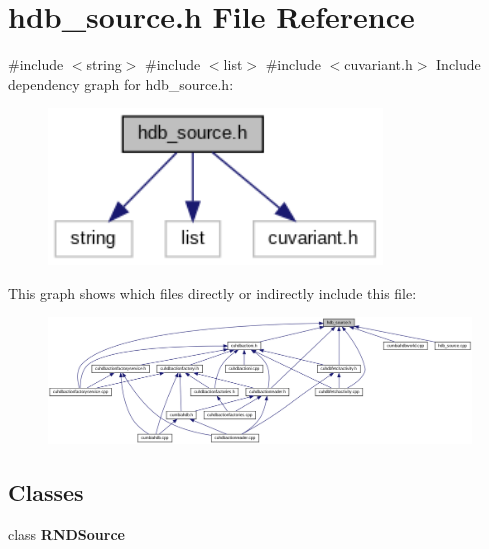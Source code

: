 \section{hdb\+\_\+source.\+h File Reference}
\label{hdb__source_8h}
{\ttfamily \#include $<$string$>$}\newline
{\ttfamily \#include $<$list$>$}\newline
{\ttfamily \#include $<$cuvariant.\+h$>$}\newline
Include dependency graph for hdb\+\_\+source.\+h\+:
\nopagebreak
\begin{figure}[H]
\begin{center}
\leavevmode
\includegraphics[width=251pt]{hdb__source_8h__incl}
\end{center}
\end{figure}
This graph shows which files directly or indirectly include this file\+:
\nopagebreak
\begin{figure}[H]
\begin{center}
\leavevmode
\includegraphics[width=350pt]{hdb__source_8h__dep__incl}
\end{center}
\end{figure}
\subsection*{Classes}
\begin{DoxyCompactItemize}
\item 
class \textbf{ R\+N\+D\+Source}
\end{DoxyCompactItemize}
